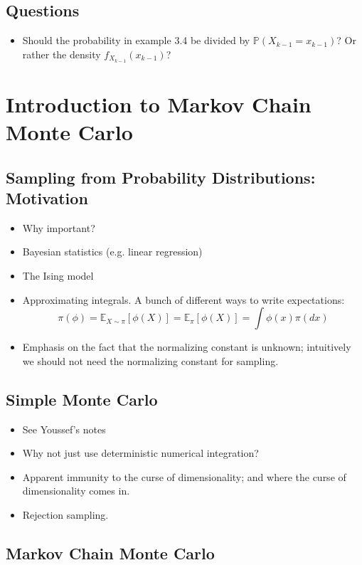 \documentclass[12pt]{article}
\newcommand{\E}{\mathbb{E}}
\newcommand{\Prob}{\mathbb{P}}
\begin{document}
\subsection{Questions}
\begin{itemize}
\item Should the probability in example 3.4 be divided by $\Prob(X_{k-1} = x_{k-1})$? Or rather the density $f_{X_{k-1}}(x_{k-1})$? 
\end{itemize}


\section{Introduction to Markov Chain Monte Carlo}

\subsection{Sampling from Probability Distributions: Motivation}
\begin{itemize}
\item Why important?
\item Bayesian statistics (e.g. linear regression)
\item The Ising model 
\item Approximating integrals. A bunch of different ways to write expectations: 
\[\pi(\phi) = \E_{X \sim \pi}\left[\phi(X)\right] = \E_{\pi}\left[\phi(X) \right] = \int \phi(x) \pi(dx) \]
\item Emphasis on the fact that the normalizing constant is unknown; intuitively we should not need the normalizing constant for sampling. 
\end{itemize}

\subsection{Simple Monte Carlo}
\begin{itemize}
\item See Youssef's notes 
\item Why not just use deterministic numerical integration? 
\item Apparent immunity to the curse of dimensionality; and where the curse of dimensionality comes in. 
\item Rejection sampling. 
\end{itemize}

\subsection{Markov Chain Monte Carlo}
\end{document}
